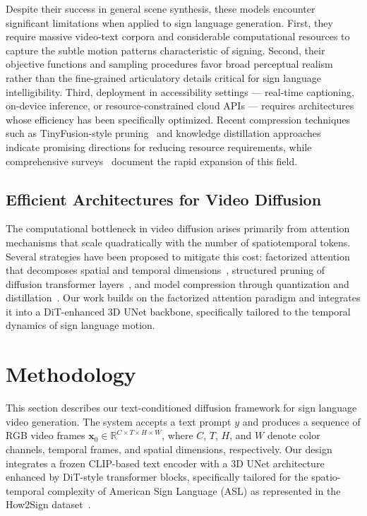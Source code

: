 \documentclass{ieeeaccess}
\begin{document}
{Despite their success in general scene synthesis, these models encounter significant limitations when applied to sign language generation. First, they require massive video-text corpora and considerable computational resources to capture the subtle motion patterns characteristic of signing. Second, their objective functions and sampling procedures favor broad perceptual realism rather than the fine-grained articulatory details critical for sign language intelligibility. Third, deployment in accessibility settings — real-time captioning, on-device inference, or resource-constrained cloud APIs — requires architectures whose efficiency has been specifically optimized. Recent compression techniques such as TinyFusion-style pruning~\cite{fang2025tinyfusion} and knowledge distillation approaches~\cite{hinton2015distillation, sanh2020distilbert} indicate promising directions for reducing resource requirements, while comprehensive surveys~\cite{zhang2025videodiffusionsurvey, arxiv2025videosurvey} document the rapid expansion of this field.

\subsection{Efficient Architectures for Video Diffusion}

The computational bottleneck in video diffusion arises primarily from attention mechanisms that scale quadratically with the number of spatiotemporal tokens. Several strategies have been proposed to mitigate this cost: factorized attention that decomposes spatial and temporal dimensions~\cite{ho2022videodiffusion}, structured pruning of diffusion transformer layers~\cite{fang2025tinyfusion}, and model compression through quantization and distillation~\cite{han2016deepcompression}. Our work builds on the factorized attention paradigm and integrates it into a DiT-enhanced 3D UNet backbone, specifically tailored to the temporal dynamics of sign language motion.

}
{\color{blue}\section{Methodology}}
\label{sec:method}

This section describes our text-conditioned diffusion framework for sign language video generation. The system accepts a text prompt $y$ and produces a sequence of RGB video frames $\mathbf{x}_0 \in \mathbb{R}^{C \times T \times H \times W}$, where $C$, $T$, $H$, and $W$ denote color channels, temporal frames, and spatial dimensions, respectively. Our design integrates a frozen CLIP-based text encoder with a 3D UNet architecture enhanced by DiT-style transformer blocks, specifically tailored for the spatio-temporal complexity of American Sign Language (ASL) as represented in the How2Sign dataset~\cite{duarte2021how2sign}.
\end{document}
